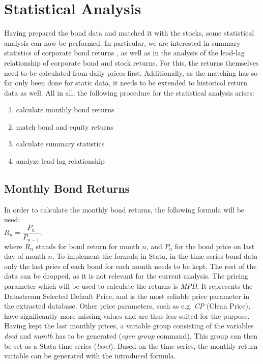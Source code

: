 \chapter{Statistical Analysis} \label{chapter:statistical-analysis}
Having prepared the bond data and matched it with the stocks, some statistical analysis can now be performed. In particular, we are interested in summary statistics of corporate bond returns \cite{q-factors}, as well as in the analysis of the lead-lag relationship of corporate bond and stock returns. For this, the returns themselves need to be calculated from daily prices first. Additionally, as the matching has so far only been done for static data, it needs to be extended to historical return data as well. All in all, the following procedure for the statistical analysis arises: 
\begin{enumerate}
	\item calculate monthly bond returns
	\item match bond and equity returns
	\item calculate summary statistics
	\item analyze lead-lag relationship
\end{enumerate}

\section{Monthly Bond Returns}
In order to calculate the monthly bond returns, the following formula will be used: \\
$R_{n} = \dfrac{P_{n}}{P_{n-1}}$, \\ where $R_{n}$ stands for bond return for month $n$, and $P_{n}$ for the bond price on last day of month $n$. 
To implement the formula in Stata, in the time series bond data only the last price of each bond for each month needs to be kept. The rest of the data can be dropped, as it is not relevant for the current analysis. The pricing parameter which will be used to calculate the returns is \textit{MPD}. It represents the Datastream Selected Default Price, and is the most reliable price parameter in the extracted database. Other price parameters, such as e.g. \textit{CP} (Clean Price), have significantly more missing values and are thus less suited for the purpose. Having kept the last monthly prices, a variable group consisting of the variables \textit{dscd} and \textit{month} has to be generated (\textit{egen} \textit{group} command). This group can then be set as a Stata time-series (\textit{tsset}). Based on the time-series, the monthly return variable can be generated with the introduced formula. 

